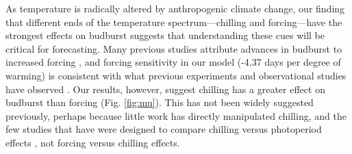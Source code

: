 \documentclass{article}
\begin{document}

\par As temperature is radically altered by anthropogenic climate change, our finding that different ends of the temperature spectrum---chilling and forcing---have the strongest effects on budburst suggests that understanding these cues will be critical for forecasting. Many previous studies attribute advances in budburst to increased forcing \citep{Basler:2014aa,bradley1999,menzel2006,harrington2015}, and forcing sensitivity in our model (-4.37 days per degree of warming) is consistent with what previous experiments and observational studies have observed \citep{wolkovich2012,menzel2006}. Our results, however, suggest chilling has a greater effect on budburst than forcing (Fig. \ref{fig:mu}). This has not been widely suggested previously, perhaps because little work has directly manipulated chilling, and the few studies that have were designed to compare chilling versus photoperiod effects \citep[e.g., ][]{Basler:2014aa,Caffarra:2011qf,Laube:2014a,zohner2016}, not forcing versus chilling effects. 
\end{document}
